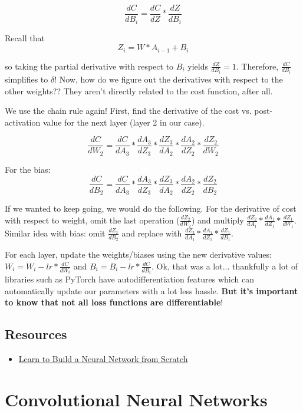 \documentclass[12pt]{article}
\begin{document}
$$\frac{dC}{dB_i} = \frac{dC}{dZ} * \frac{dZ}{dB_i}$$

Recall that
$$Z_i = W * A_{i-1} + B_i$$

so taking the partial derivative with respect to $B_i$ yields $\frac{dZ}{dB_i} = 1$. Therefore, $\frac{dC}{dB_i}$ simplifies to $\delta$! Now, how do we figure out the derivatives with respect to the other weights?? They aren't directly related to the cost function, after all. 

We use the chain rule again! First, find the derivative of the cost vs. post-activation value for the next layer (layer 2 in our case). 

$$\frac{dC}{dW_2} = \frac{dC}{dA_3} * \frac{dA_3}{dZ_3} * \frac{dZ_3}{dA_2} * \frac{dA_2}{dZ_2} * \frac{dZ_2}{dW_2}$$

For the bias:
$$\frac{dC}{dB_2} = \frac{dC}{dA_3} * \frac{dA_3}{dZ_3} * \frac{dZ_3}{dA_2} * \frac{dA_2}{dZ_2} * \frac{dZ_2}{dB_2}$$

If we wanted to keep going, we would do the following. For the derivative of cost with respect to weight, omit the last operation ($\frac{dZ_2}{dW_2}$) and multiply $\frac{dZ_2}{dA_1} * \frac{dA_1}{dZ_1} * \frac{dZ_1}{dW_1}$. Similar idea with bias: omit $\frac{dZ_2}{dB_2}$ and replace with $\frac{dZ_2}{dA_1} * \frac{dA_1}{dZ_1} * \frac{dZ_1}{dB_1}$. 


For each layer, update the weights/biases using the new derivative values: $W_i = W_i - lr * \frac{dC}{dW_i}$ and $B_i = B_i - lr * \frac{dC}{dB_i}$. Ok, that was a lot... thankfully a lot of libraries such as PyTorch have autodifferentiation features which can automatically update our parameters with a lot less hassle. \textbf{But it's important to know that not all loss functions are differentiable}!

\subsection{Resources}
\begin{itemize}
  
  \item \href{https://medium.com/@waadlingaadil/learn-to-build-a-neural-network-from-scratch-yes-really-cac4ca457efc}{Learn to Build a Neural Network from Scratch}
\end{itemize}

\section{Convolutional Neural Networks}
\end{document}
